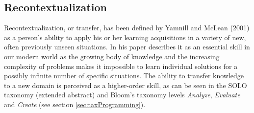 %



\subsection{Recontextualization}
Recontextualization, or transfer, has been defined by Yamnill and McLean (2001) as a person’s ability to apply his or her learning acquisitions in a variety of new, often previously unseen situations. In his paper \citeauthor{oers2004recontextualization} describes it as an essential skill in our modern world as the growing body of knowledge and the increasing complexity of problems makes it impossible to learn individual solutions for a possibly infinite number of specific situations. The ability to transfer knowledge to a new domain is perceived as a higher-order skill, as can be seen in the SOLO taxonomy (extended abstract) and Bloom's taxonomy levels \textit{Analyze}, \textit{Evaluate} and \textit{Create} (see section \ref{sec:taxProgramming}).


